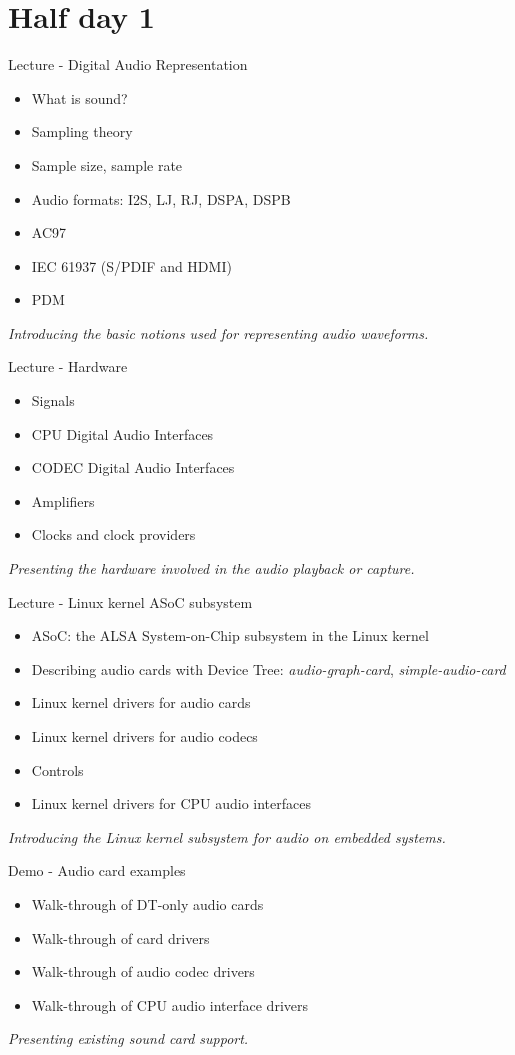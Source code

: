 \documentclass[a4paper,12pt,obeyspaces,spaces,hyphens]{article}
\begin{document}
\feshowtitle

\feshowinfo

\section{Half day 1}

\feagendatwocolumn
{Lecture - Digital Audio Representation}
{
  \begin{itemize}
  \item What is sound?
  \item Sampling theory
  \item Sample size, sample rate
  \item Audio formats: I2S, LJ, RJ, DSPA, DSPB
  \item AC97
  \item IEC 61937 (S/PDIF and HDMI)
  \item PDM
  \end{itemize}
  \vspace{0.5em}
  {\em Introducing the basic notions used for representing audio waveforms.}
}
{Lecture - Hardware}
{
  \begin{itemize}
  \item Signals
  \item CPU Digital Audio Interfaces
  \item CODEC Digital Audio Interfaces
  \item Amplifiers
  \item Clocks and clock providers
  \end{itemize}
  \vspace{0.5em}
  {\em Presenting the hardware involved in the audio playback or capture.}
}

\feagendatwocolumn
{Lecture - Linux kernel ASoC subsystem}
{
  \begin{itemize}
  \item ASoC: the ALSA System-on-Chip subsystem in the Linux kernel
  \item Describing audio cards with Device Tree: {\em
      audio-graph-card}, {\em simple-audio-card}
  \item Linux kernel drivers for audio cards
  \item Linux kernel drivers for audio codecs
  \item Controls
  \item Linux kernel drivers for CPU audio interfaces
  \end{itemize}
  \vspace{0.5em}
  {\em Introducing the Linux kernel subsystem for audio on embedded systems.}
}
{Demo - Audio card examples}
{
  \begin{itemize}
  \item Walk-through of DT-only audio cards
  \item Walk-through of card drivers
  \item Walk-through of audio codec drivers
  \item Walk-through of CPU audio interface drivers
  \end{itemize}
  \vspace{0.5em}
  {\em Presenting existing sound card support.}
}
\end{document}
